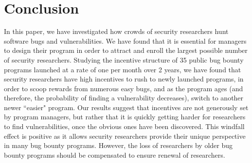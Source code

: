 \section{Conclusion}
\label{sec:conclusion}
In this paper, we have investigated how crowds of security researchers hunt software bugs and vulnerabilities. We have found that it is essential for managers to design their program in order to attract and enroll the largest possible number of security researchers. Studying the incentive structure of 35 public bug bounty programs launched at a rate of one per month over 2 years, we have found that security researchers have high incentives to rush to newly launched programs, in order to scoop rewards from numerous easy bugs, and as the program ages (and therefore, the probability of finding a vulnerability decreases), switch to another newer ``easier" program. Our results suggest that incentives are not generously set by program managers, but rather that it is quickly getting harder for researchers to find vulnerabilities, once the obvious ones have been discovered. This windfall effect is positive as it allows security researchers provide their unique perspective in many bug bounty programs. However, the loss of researchers by older bug bounty programs should be compensated to ensure renewal of researchers. 